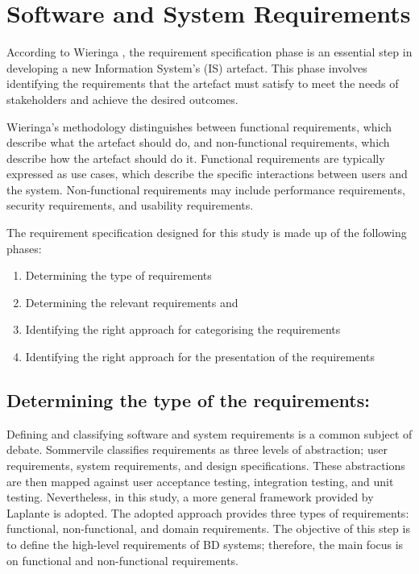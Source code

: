 \documentclass{ieeeaccess}
\begin{document}
\section{Software and System Requirements}

\label{sec:software_and_system_requirements}

According to Wieringa \cite{wieringa2014design}, the requirement specification phase is an essential step in developing a new Information System's (IS) artefact. This phase involves identifying the requirements that the artefact must satisfy to meet the needs of stakeholders and achieve the desired outcomes.

Wieringa's methodology distinguishes between functional requirements, which describe what the artefact should do, and non-functional requirements, which describe how the artefact should do it. Functional requirements are typically expressed as use cases, which describe the specific interactions between users and the system. Non-functional requirements may include performance requirements, security requirements, and usability requirements.

The requirement specification designed for this study is made up of the following phases: 

\begin{enumerate}

    \item Determining the type of requirements 

    \item Determining the relevant requirements and 

    \item Identifying the right approach for categorising the requirements 

    \item Identifying the right approach for the presentation of the requirements 

\end{enumerate}

\subsection{Determining the type of the requirements:}

Defining and classifying software and system requirements is a common subject of debate. Sommervile \cite{sommerville2011software} classifies requirements as three levels of abstraction; user requirements, system requirements, and design specifications. These abstractions are then mapped against user acceptance testing, integration testing, and unit testing. Nevertheless, in this study, a more general framework provided by Laplante \cite{laplante2017requirements} is adopted. The adopted approach provides three types of requirements: functional, non-functional, and domain requirements. The objective of this step is to define the high-level requirements of BD systems; therefore, the main focus is on functional and non-functional requirements. 
\end{document}
